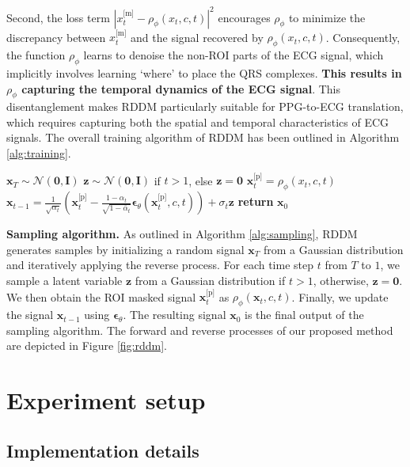 \documentclass[letterpaper]{article} %
\newcommand{\bI}{\mathbf{I}}
\newcommand{\bzero}{\mathbf{0}}
\newcommand{\bz}{\mathbf{z}}
\newcommand{\bepsilon}{{\boldsymbol{\epsilon}}}
\newcommand{\x}{{\boldsymbol x}}
\begin{document}
Second, the loss term $|x_t^{\text{[m]}} - \rho_{\phi}(x_t, c, t)|^2$ encourages $\rho_{\phi}$ to minimize the discrepancy between $x_t^{\text{[m]}}$ and the signal recovered by $\rho_{\phi}(x_t, c, t)$.
Consequently, the function $\rho_{\phi}$ learns to denoise the non-ROI parts of the ECG signal, which implicitly involves learning `where' to place the QRS complexes. 
\textbf{This results in $\rho_{\phi}$ capturing the temporal dynamics of the ECG signal}. This disentanglement makes RDDM particularly suitable for PPG-to-ECG translation, which requires capturing both the spatial and temporal characteristics of ECG signals. The overall training algorithm of RDDM has been outlined in Algorithm \ref{alg:training}. 

\begin{algorithm}[t]
  \caption{RDDM Sampling} \label{alg:sampling}
  \small
  \begin{algorithmic}[1]
    \State $\x_T \sim \mathcal{N}(\bzero, \bI)$
      \State $\bz \sim \mathcal{N}(\bzero, \bI)$ if $t > 1$, else $\bz = \bzero$
      \State $\x_t^{\text{[p]}} = \rho_{\phi}(x_t, c, t)$
      \State $\x_{t-1}\!=\!\frac{1}{\sqrt{\alpha_t}}\left( \x_t^{\text{[p]}} - \frac{1-\alpha_t}{\sqrt{1-\bar\alpha_t}} \bepsilon_\theta(\x_t^{\text{[p]}}, c, t) \right) + \sigma_t \bz$
    \EndFor
    \State \textbf{return} $\x_0$
  \end{algorithmic}
\end{algorithm}

\noindent\textbf{Sampling algorithm.} As outlined in Algorithm \ref{alg:sampling}, RDDM generates samples by initializing a random signal $\x_T$ from a Gaussian distribution and iteratively applying the reverse process. For each time step $t$ from $T$ to $1$, we sample a latent variable $\bz$ from a Gaussian distribution if $t > 1$, otherwise, $\bz = \bzero$. We then obtain the ROI masked signal $\x_t^{\text{[p]}}$ as $\rho_{\phi}(\x_t, c, t)$. Finally, we update the signal $\x_{t-1}$ using $\boldsymbol{\epsilon}_\theta$. The resulting signal $\x_0$ is the final output of the sampling algorithm. The forward and reverse processes of our proposed method are depicted in Figure \ref{fig:rddm}.

\section{Experiment setup}

\subsection{Implementation details}
\end{document}
